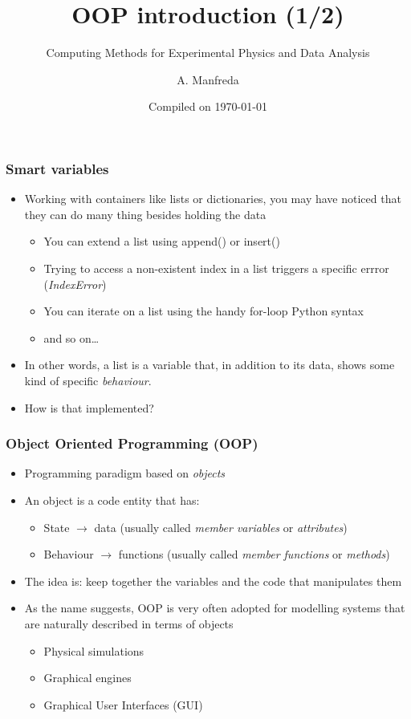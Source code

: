 \documentclass[9pt]{beamer}
\title{OOP introduction (1/2)}
\subtitle{Computing Methods for Experimental Physics and Data Analysis}
\date{Compiled on \today}
\author{A. Manfreda}
\institute[INFN]{INFN--Pisa}
\begin{document}
\titleframe


\begin{frame}
  \frametitle{Smart variables}
  
  \begin{itemize}
    \item Working with containers like lists or dictionaries, you may have noticed
          that they can do many thing besides holding the data
    \medskip
    \begin{itemize}
      \item You can extend a list using append() or insert()
      \item Trying to access a non-existent index in a list triggers a specific errror (\emph{IndexError})
      \item You can iterate on a list using the handy for-loop Python syntax
      \item and so on\dots
     \end{itemize}
     \medskip
     \item In other words, a list is a variable that, in addition to its data,
           shows some kind of specific \emph{behaviour}.
     \medskip
     \item How is that implemented?
  \end{itemize}
\end{frame}



\begin{frame}
  \frametitle{Object Oriented Programming (OOP)}
  
  \begin{itemize}
    \small
    \item Programming paradigm based on \emph{objects}
    \bigskip
    \item An object is a code entity that has:
    \smallskip
    \begin{itemize}
      \item \alert{State} $\rightarrow$ data (usually called \emph{member variables} or \emph{attributes})
      \smallskip
      \item \alert{Behaviour} $\rightarrow$ functions (usually called \emph{member functions} or \emph{methods})
    \end{itemize}
    \bigskip
    \item The idea is: keep together the variables and the code that manipulates them
    \bigskip
    \item As the name suggests, OOP is very often adopted for modelling systems that are naturally
          described in terms of objects  
    \begin{itemize}
      \smallskip
      \item Physical simulations
      \smallskip
      \item Graphical engines
      \smallskip
      \item Graphical User Interfaces (GUI) 
    \end{itemize}

  \end{itemize}
\end{frame}
\end{document}
